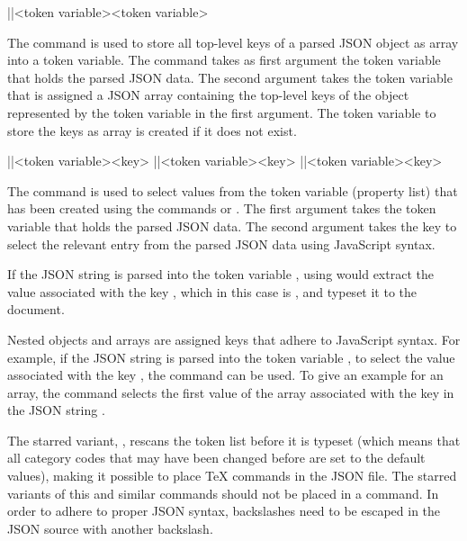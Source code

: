 \documentclass[a4paper]{article}
\begin{document}
{{\begin{macrodef}
|\JSONParseKeys|{<token variable>}{<token variable>}
\end{macrodef}
The command \macro{\JSONParseKeys} is used to store all top-level keys of a parsed JSON object as array into a token variable. The command takes as first argument the token variable that holds the parsed JSON data. The second argument takes the token variable that is assigned a JSON array containing the top-level keys of the object represented by the token variable in the first argument. The token variable to store the keys as array is created if it does not exist.

\begin{macrodef}
|\JSONParseValue|{<token variable>}{<key>}
|\JSONParseValue*|{<token variable>}{<key>}
|\JSONParseExpandableValue|{<token variable>}{<key>}
\end{macrodef}
The command \macro{\JSONParseValue} is used to select values from the token variable (property list) that has been created using the commands \macro{\JSONParse} or \macro{\JSONParseFromFile}. The first argument takes the token variable that holds the parsed JSON data. The second argument takes the key to select the relevant entry from the parsed JSON data using JavaScript syntax.

If the JSON string  is parsed into the token variable \macro{\myJSONdata}, using  would extract the value associated with the key , which in this case is , and typeset it to the document.

Nested objects and arrays are assigned keys that adhere to JavaScript syntax. For example, if the JSON string  is parsed into the token variable \macro{\myJSONdata}, to select the value associated with the key , the command  can be used. To give an example for an array, the command  selects the first value of the array associated with the key  in the JSON string .

The starred variant, \macro{\JSONParseValue*}, rescans the token list before it is typeset (which means that all category codes that may have been changed before are set to the default values), making it possible to place TeX commands in the JSON file. The starred variants of this and similar commands should not be placed in a \macro{\JSONParse} command. In order to adhere to proper JSON syntax, backslashes need to be escaped in the JSON source with another backslash. 

}}
\end{document}
